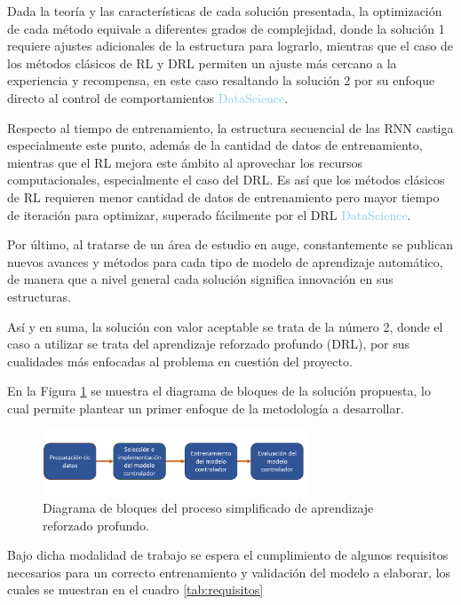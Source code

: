 Dada la teoría y las características de cada solución presentada, la optimización de cada método equivale a diferentes grados de complejidad, donde la solución 1 requiere ajustes adicionales de la estructura para lograrlo, mientras que el caso de los métodos clásicos de RL y DRL permiten un ajuste más cercano a la experiencia y recompensa, en este caso resaltando la solución 2 por su enfoque directo al control de comportamientos \textcolor{SkyBlue}{DataScience}.

Respecto al tiempo de entrenamiento, la estructura secuencial de las RNN castiga especialmente este punto, además de la cantidad de datos de entrenamiento, mientras que el RL mejora este ámbito al aprovechar los recursos computacionales, especialmente el caso del DRL. Es así que los métodos clásicos de RL requieren menor cantidad de datos de entrenamiento pero mayor tiempo de iteración para optimizar, superado fácilmente por el DRL \textcolor{SkyBlue}{DataScience}.

Por último, al tratarse de un área de estudio en auge, constantemente se publican nuevos avances y métodos para cada tipo de modelo de aprendizaje automático, de manera que a nivel general cada solución significa innovación en sus estructuras.

Así y en suma, la solución con valor aceptable se trata de la número 2, donde el caso a utilizar se trata del aprendizaje reforzado profundo (DRL), por sus cualidades más enfocadas al problema en cuestión del proyecto.

En la Figura \ref{fig:Diagbloques} se muestra el diagrama de bloques de la solución propuesta, lo cual permite plantear un primer enfoque de la metodología a desarrollar.

\begin{figure}[!h]
    \centering
    \includegraphics[width=0.7\textwidth]{fig/new/Diagbloques.png}
    \caption{Diagrama de bloques del proceso simplificado de aprendizaje reforzado profundo.}
    \label{fig:Diagbloques}
\end{figure}

Bajo dicha modalidad de trabajo se espera el cumplimiento de algunos requisitos necesarios para un correcto entrenamiento y validación del modelo a elaborar, los cuales se muestran en el cuadro \ref{tab:requisitos}

